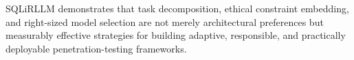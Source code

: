 SQLiRLLM demonstrates that task decomposition, ethical constraint embedding, and
right-sized model selection are not merely architectural preferences but
measurably effective strategies for building adaptive, responsible, and
practically deployable penetration-testing frameworks.

